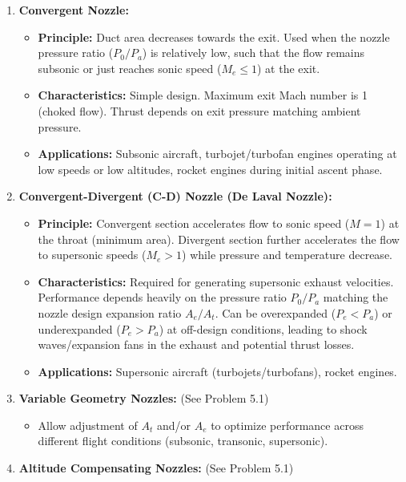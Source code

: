 \begin{enumerate}
\def\labelenumi{\arabic{enumi}.}
\tightlist
\item
  \textbf{Convergent Nozzle:}

  \begin{itemize}
  \tightlist
  \item
    \textbf{Principle:} Duct area decreases towards the exit. Used when
    the nozzle pressure ratio (\(P_0/P_a\)) is relatively low, such that
    the flow remains subsonic or just reaches sonic speed
    (\(M_e \le 1\)) at the exit.
  \item
    \textbf{Characteristics:} Simple design. Maximum exit Mach number is
    1 (choked flow). Thrust depends on exit pressure matching ambient
    pressure.
  \item
    \textbf{Applications:} Subsonic aircraft, turbojet/turbofan engines
    operating at low speeds or low altitudes, rocket engines during
    initial ascent phase.
  \end{itemize}
\item
  \textbf{Convergent-Divergent (C-D) Nozzle (De Laval Nozzle):}

  \begin{itemize}
  \tightlist
  \item
    \textbf{Principle:} Convergent section accelerates flow to sonic
    speed (\(M=1\)) at the throat (minimum area). Divergent section
    further accelerates the flow to supersonic speeds (\(M_e > 1\))
    while pressure and temperature decrease.
  \item
    \textbf{Characteristics:} Required for generating supersonic exhaust
    velocities. Performance depends heavily on the pressure ratio
    \(P_0/P_a\) matching the nozzle design expansion ratio \(A_e/A_t\).
    Can be overexpanded (\(P_e < P_a\)) or underexpanded (\(P_e > P_a\))
    at off-design conditions, leading to shock waves/expansion fans in
    the exhaust and potential thrust losses.
  \item
    \textbf{Applications:} Supersonic aircraft (turbojets/turbofans),
    rocket engines.
  \end{itemize}
\item
  \textbf{Variable Geometry Nozzles:} (See Problem 5.1)

  \begin{itemize}
  \tightlist
  \item
    Allow adjustment of \(A_t\) and/or \(A_e\) to optimize performance
    across different flight conditions (subsonic, transonic,
    supersonic).
  \end{itemize}
\item
  \textbf{Altitude Compensating Nozzles:} (See Problem 5.1)


\end{enumerate}
